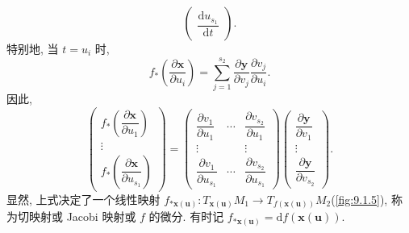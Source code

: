 \begin{definition}
\[\begin{pmatrix}
    \dfrac{\mathrm{d}u_{s_{1}}}{\mathrm{d}t}
  \end{pmatrix}.
\]
特别地, 当 $t = u_{i}$ 时,
\[
  f_{*}\left(\frac{\partial\boldsymbol{x}}{\partial u_{i}}\right) = \sum_{j=1}^{s_{2}}\frac{\partial\boldsymbol{y}}{\partial v_{j}}\frac{\partial v_{j}}{\partial u_{i}}.
\]
因此,
\[
  \begin{pmatrix}
    f_{*}\left(\dfrac{\partial\boldsymbol{x}}{\partial u_{1}}\right) \\
    \vdots \\
    f_{*}\left(\dfrac{\partial\boldsymbol{x}}{\partial u_{s_{1}}}\right)
  \end{pmatrix} = \begin{pmatrix}
    \dfrac{\partial v_{1}}{\partial u_{1}} & \cdots & \dfrac{\partial v_{s_{2}}}{\partial u_{1}} \\
    \vdots & & \vdots \\
    \dfrac{\partial v_{1}}{\partial u_{s_{1}}} & \cdots & \dfrac{\partial v_{s_{2}}}{\partial u_{s_{1}}}
  \end{pmatrix}\begin{pmatrix}
    \dfrac{\partial\boldsymbol{y}}{\partial v_{1}} \\
    \vdots \\
    \dfrac{\partial\boldsymbol{y}}{\partial v_{s_{2}}}
  \end{pmatrix}.
\]
显然, 上式决定了一个线性映射 $f_{*\boldsymbol{x}(\boldsymbol{u})}\colon T_{\boldsymbol{x}(\boldsymbol{u})}M_{1} \to T_{f(\boldsymbol{x}(\boldsymbol{u}))}M_{2}$(\cref{fig:9.1.5}), 称为切映射或 Jacobi 映射或 $f$ 的微分. 有时记 $f_{*\boldsymbol{x}(\boldsymbol{u})} = \mathrm{d}f(\boldsymbol{x}(\boldsymbol{u}))$.
\end{definition}

